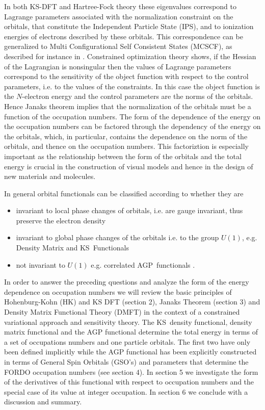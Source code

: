 \documentclass[aps,preprint]{revtex4}%
\begin{document}
In both KS-DFT and Hartree-Fock theory these eigenvalues correspond to
Lagrange parameters associated with the normalization constraint on the
orbitals, that constitute the Independent Particle State (IPS), and to
ionization energies of electrons described by these orbitals. This
correspondence can be generalized to Multi Configurational Self Consistent
States (MCSCF), as described for instance in \cite{WeinerOrtiz05}. Constrained
optimization theory \cite{Hestenes} shows, if the Hessian of the Lagrangian is
nonsingular then the values of Lagrange parameters correspond to the
sensitivity of the object function with respect to the control parameters,
i.e. to the values of the constraints. In this case the object function is the
$N$-electron energy and the control parameters are the norms of the orbitals.
Hence Janaks theorem implies that the normalization of the orbitals must be a
function of the occupation numbers. The form of the dependence of the energy
on the occupation numbers can be factored through the dependency of the energy
on the orbitals, which, in particular, contains the dependence on the norm of
the orbitals, and thence on the occupation numbers. This factoriztion is
especially important as the relationship between the form of the orbitals and
the total energy is crucial in the construction of visual models and hence in
the design of new materials and molecules.

In general orbital functionals can be classified according to whether they are

\begin{itemize}
\item invariant to local phase changes of orbitals, i.e. are gauge invariant,
thus preserve the electron density

\item invariant to global phase changes of the orbitals i.e. to the group
$U\left(  1\right)  $, e.g. Density Matrix and KS\ Functionals

\item not invariant to $U\left(  1\right)  $ e.g. correlated AGP\ functionals
\cite{Weiner&Ortiz2005}.
\end{itemize}

In order to answer the preceding questions and analyze the form of the energy
dependence on occupation numbers we will review the basic principles of
Hohenburg-Kohn (HK) and KS DFT (section 2), Janaks Theorem (section 3) and
Density Matrix Functional Theory (DMFT) in the context of a constrained
variational approach and sensitivity theory. The KS\ density functional,
density matrix functional and the AGP functional determine the total energy in
terms of a set of occupations numbers and one particle orbitals. The first two
have only been defined implicitly while the AGP functional has been explicitly
constructed \cite{Weiner&Ortiz2005} in terms of General Spin Orbitals (GSO's)
and parameters that determine the FORDO occupation numbers (see section 4). In
section 5 we investigate the form of the derivatives of this functional with
respect to occupation numbers and the special case of its value at integer
occupation. In section 6 we conclude with a discussion and summary.
\end{document}
